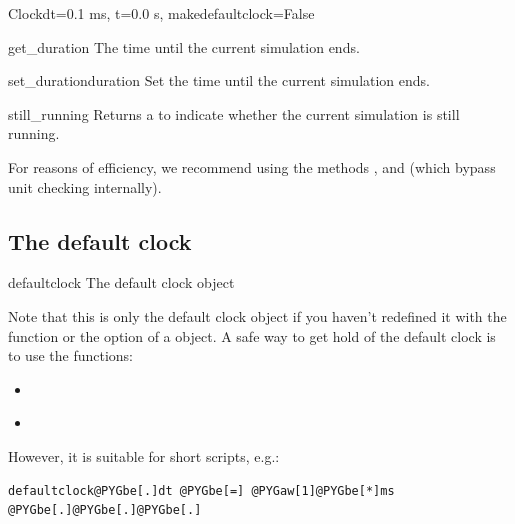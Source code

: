 \documentclass[letterpaper,10pt,english]{manual}
\begin{document}
\begin{classdesc}{Clock}{dt=0.1 ms, t=0.0 s, makedefaultclock=False}
\hypertarget{brian.Clock.get_duration}{}\begin{methoddesc}{get\_duration}{}
The time until the current simulation ends.
\end{methoddesc}

\hypertarget{brian.Clock.set_duration}{}\begin{methoddesc}{set\_duration}{duration}
Set the time until the current simulation ends.
\end{methoddesc}

\hypertarget{brian.Clock.still_running}{}\begin{methoddesc}{still\_running}{}
Returns a  to indicate whether the current
simulation is still running.
\end{methoddesc}

For reasons of efficiency, we recommend using the methods
\hyperlink{brian.Clock.tick}{}, \hyperlink{brian.Clock.set_duration}{} and \hyperlink{brian.Clock.still_running}{}
(which bypass unit checking internally).
\end{classdesc}

\subsection{The default clock}

\hypertarget{brian.defaultclock}{}\begin{datadesc}{defaultclock}
The default clock object

Note that this is only the default clock object if you haven't
redefined it with the \hyperlink{brian.define_default_clock}{} function or the
 option of a \hyperlink{brian.Clock}{} object. A safe way to
get hold of the default clock is to use the functions:
\begin{itemize}
\item {} 
\hyperlink{brian.get_default_clock}{}

\item {} 
\hyperlink{brian.reinit_default_clock}{}

\end{itemize}

However, it is suitable for short scripts, e.g.:

\begin{Verbatim}[commandchars=@\[\]]
defaultclock@PYGbe[.]dt @PYGbe[=] @PYGaw[1]@PYGbe[*]ms
@PYGbe[.]@PYGbe[.]@PYGbe[.]
\end{Verbatim}
\end{datadesc}
\end{document}
